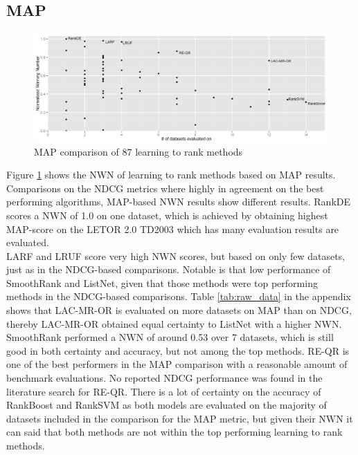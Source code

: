 \documentclass{sig-alternate}
\begin{document}
\subsection{MAP}
\begin{figure}
\centering
\includegraphics[scale=0.19]{gfx/map_winnum}
\caption{MAP comparison of 87 learning to rank methods}
\label{fig:normalized_winning_number_map}
\end{figure}
Figure \ref{fig:normalized_winning_number_map} shows the NWN of learning to rank methods based on MAP results. Comparisons on the NDCG metrics where highly in agreement on the best performing algorithms, MAP-based NWN results show different results. RankDE scores a NWN of 1.0 on one dataset, which is achieved by obtaining highest MAP-score on the LETOR 2.0 TD2003 which has many evaluation results are evaluated.\\

LARF and LRUF score very high NWN scores, but based on only few datasets, just as in the NDCG-based comparisons. Notable is that low performance of SmoothRank and ListNet, given that those methods were top performing methods in the NDCG-based comparisons. Table \ref{tab:raw_data} in the appendix shows that LAC-MR-OR is evaluated on more datasets on MAP than on NDCG, thereby LAC-MR-OR obtained equal certainty to ListNet with a higher NWN. SmoothRank performed a NWN of around 0.53 over 7 datasets, which is still good in both certainty and accuracy, but not among the top methods. RE-QR is one of the best performers in the MAP comparison with a reasonable amount of benchmark evaluations. No reported NDCG performance was found in the literature search for RE-QR. There is a lot of certainty on the accuracy of RankBoost and RankSVM as both models are evaluated on the majority of datasets included in the comparison for the MAP metric, but given their NWN it can said that both methods are not within the top performing learning to rank methods.
\end{document}
